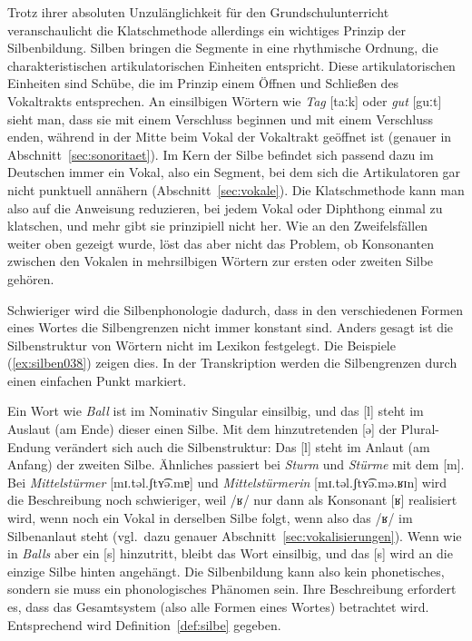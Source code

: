 Trotz ihrer absoluten Unzulänglichkeit für den Grundschulunterricht veranschaulicht die Klatschmethode allerdings ein wichtiges Prinzip der Silbenbildung.
Silben bringen die Segmente in eine rhythmische Ordnung, die charakteristischen artikulatorischen Einheiten entspricht.
Diese artikulatorischen Einheiten sind Schübe, die im Prinzip einem Öffnen und Schließen des Vokaltrakts entsprechen.
An einsilbigen Wörtern wie \textit{Tag} [taːk] oder \textit{gut} [guːt] sieht man, dass sie mit einem Verschluss beginnen und mit einem Verschluss enden, während in der Mitte beim Vokal der Vokaltrakt geöffnet ist (genauer in Abschnitt~\ref{sec:sonoritaet}).
Im Kern der Silbe befindet sich passend dazu im Deutschen immer ein Vokal, also ein Segment, bei dem sich die Artikulatoren gar nicht punktuell annähern (Abschnitt~\ref{sec:vokale}).
Die Klatschmethode kann man also auf die Anweisung reduzieren, bei jedem Vokal oder Diphthong einmal zu klatschen, und mehr gibt sie prinzipiell nicht her.
Wie an den Zweifelsfällen weiter oben gezeigt wurde, löst das aber nicht das Problem, ob Konsonanten zwischen den Vokalen in mehrsilbigen Wörtern zur ersten oder zweiten Silbe gehören.

Schwieriger wird die Silbenphonologie dadurch, dass in den verschiedenen Formen eines Wortes die Silbengrenzen nicht immer konstant sind.
Anders gesagt ist die Silbenstruktur von Wörtern nicht im Lexikon festgelegt.
Die Beispiele (\ref{ex:silben038}) zeigen dies.
In der Transkription werden die Silbengrenzen durch einen einfachen Punkt markiert.

\begin{exe}
  \ex\label{ex:silben038}
  \begin{xlist}
  \end{xlist}
\end{exe}

Ein Wort wie \textit{Ball} ist im Nominativ Singular einsilbig, und das [l] steht im Auslaut (am Ende) dieser einen Silbe.
Mit dem hinzutretenden [ə] der Plural-Endung verändert sich auch die Silbenstruktur:
Das [l] steht im Anlaut (am Anfang) der zweiten Silbe.
Ähnliches passiert bei \textit{Sturm} und \textit{Stürme} mit dem [m].
Bei \textit{Mittelstürmer} [mɪ.təl.ʃtʏ͡ə.mɐ] und \textit{Mittelstürmerin} [mɪ.təl.ʃtʏ͡ə.mə.ʁɪn] wird die Beschreibung noch schwieriger, weil /ʁ/ nur dann als Konsonant [ʁ] realisiert wird, wenn noch ein Vokal in derselben Silbe folgt, wenn also das /ʁ/ im Silbenanlaut steht (vgl.\ dazu genauer Abschnitt~\ref{sec:vokalisierungen}).
Wenn wie in \textit{Balls} aber ein [s] hinzutritt, bleibt das Wort einsilbig, und das [s] wird an die einzige Silbe hinten angehängt.
Die Silbenbildung kann also kein phonetisches, sondern sie muss ein phonologisches Phänomen sein.
Ihre Beschreibung erfordert es, dass das Gesamtsystem (also \zB alle Formen eines Wortes) betrachtet wird.
Entsprechend wird Definition~\ref{def:silbe} gegeben.

